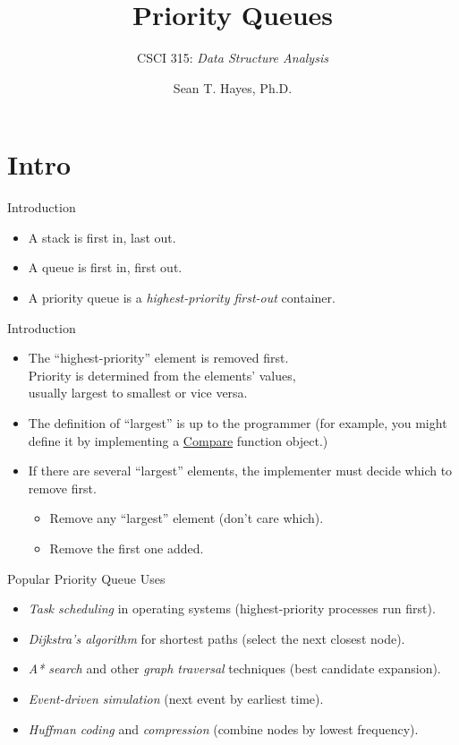 \documentclass[14pt, aspectratio=1610]{beamer}
\title{\Huge{} Priority Queues}
\subtitle{CSCI 315: \textit{Data Structure Analysis}}
\author{Sean T. Hayes, Ph.D.}
\institute{Charleston Southern University}
\begin{document}
\begin{frame}
  \titlepage{}
\end{frame}

\section*{Intro}

\begin{frame}{Introduction}
  \begin{itemize}[<+->]
  \item
    A stack is first in, last out.
  \item
    A queue is first in, first out.
  \item
    A priority queue is a \textit{highest-priority first-out} container.
  \end{itemize}
\end{frame}

\begin{frame}{Introduction}
  \begin{itemize}[<+->]
  \item
    The ``highest-priority'' element is removed first.\\
    Priority is determined from the elements' values,\\ usually largest to smallest or vice versa.
  \item
    The definition of ``largest'' is up to the programmer (for example, you might define it by implementing a \href{https://en.cppreference.com/w/cpp/named_req/Compare}{Compare} function object.)
  \item
    If there are several ``largest'' elements, the implementer must decide which to remove first.
    \begin{itemize}
    \item
      Remove any ``largest'' element (don't care which).
    \item
      Remove the first one added.
    \end{itemize}
  \end{itemize}
\end{frame}

\begin{frame}{Popular Priority Queue Uses}
  \begin{itemize}[<+->]
  \item
    \emph{Task scheduling} in operating systems (highest-priority processes run first).
  \item
    \emph{Dijkstra's algorithm} for shortest paths (select the next closest node).
  \item
    \emph{A* search} and other \emph{graph traversal} techniques (best candidate expansion).
  \item
    \emph{Event-driven simulation} (next event by earliest time).
  \item
    \emph{Huffman coding} and \emph{compression} (combine nodes by lowest frequency).
  \end{itemize}
\end{frame}
\end{document}
